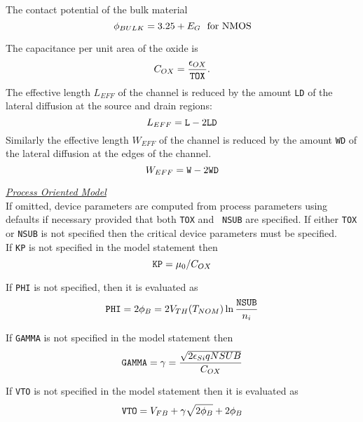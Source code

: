 \documentclass{article}
\newcommand{\PHI}{2\phi_{B}}
\newcommand{\GAMMA}{\gamma}
\begin{document}
\noindent The contact potential of the bulk material
\begin{equation}
\phi_{BULK} = 3.25 + E_G \mbox{ \ for  NMOS}\\
\end{equation}

\noindent The capacitance per unit area of the oxide is
\begin{equation}
C_{OX} = {{\epsilon_{OX}} \over {\tt TOX}} .
\end{equation}
The effective length $L_{EFF}$ of the channel is reduced by the
amount {\tt LD} of the lateral diffusion at the source and drain
regions:
\begin{equation}
L_{EFF} = {\tt L} - 2{\tt LD}
\end{equation}
Similarly the effective length $W_{EFF}$ of the channel is reduced
by the amount {\tt WD} of the lateral diffusion at the edges of
the channel.
\begin{equation}
W_{EFF} = {\tt W}  - 2{\tt WD}
\end{equation}

\vfill \noindent\underline{\sl \large Process Oriented Model}
\\[0.1in]
If omitted, device parameters are computed from process parameters
using defaults if necessary provided that both {\tt TOX} and {\tt
NSUB} are specified.  If either {\tt TOX} or {\tt NSUB} is not
specified then the critical device parameters must be specified.\\

\noindent If {\tt KP} is not specified in the model statement then
\begin{equation}
{\tt KP} = \mu_{0} / C_{OX}
\end{equation}

\noindent If {\tt PHI} is not specified, then it is evaluated as
\begin{equation}
{\tt PHI} = \PHI = 2V_{TH}(T_{NOM})\ln{{\tt NSUB} \over {n_{i}}}
\end{equation}

\noindent If {\tt GAMMA} is not specified in the model statement
then
\begin{equation}
{\tt GAMMA} = \GAMMA = {{\sqrt{2\epsilon_{Si} q NSUB}} \over
{C_{OX}}} \label{gammaomitted}
\end{equation}

\noindent If {\tt VTO} is not specified in the model statement
then it is evaluated as
\begin{equation}
{\tt VTO} = V_{FB} + {\GAMMA} \sqrt{\PHI} + \PHI
\end{equation}
\end{document}
